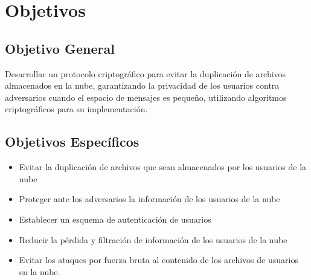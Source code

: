 \section{Objetivos} %

    \subsection{Objetivo General} %
    Desarrollar un protocolo criptográfico para evitar la duplicación de archivos almacenados en la nube, garantizando la privacidad de los usuarios contra adversarios cuando el espacio de mensajes es pequeño, utilizando algoritmos criptográficos para su implementación. 
     
    \subsection{Objetivos Específicos} %
	\begin{itemize}
		\item Evitar la duplicación de archivos que sean almacenados por los usuarios de la nube
		\item Proteger ante los adversarios la información de los usuarios de la nube
		\item Establecer un esquema de autenticación de usuarios 
		\item Reducir la pérdida y filtración de información de los usuarios de la nube
		\item Evitar los ataques por fuerza bruta al contenido de los archivos de usuarios en la nube. 
 	\end{itemize}
    